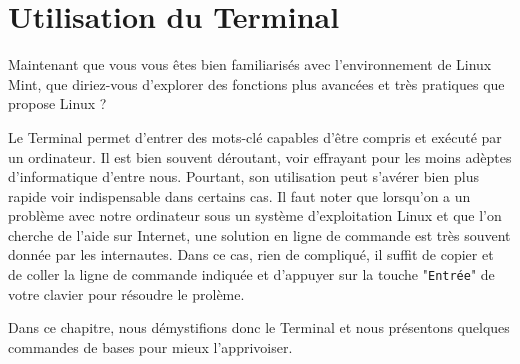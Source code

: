 \documentclass[12pt]{book}
\begin{document}
\chapter{Utilisation du Terminal}\label{sec:terminal}%
Maintenant que vous vous êtes bien familiarisés avec l'environnement de Linux Mint, que diriez-vous d'explorer des fonctions plus avancées et très pratiques que propose Linux ?\par
Le Terminal permet d'entrer des mots-clé capables d'être compris et exécuté par un ordinateur.
Il est bien souvent déroutant, voir effrayant pour les moins adèptes d'informatique d'entre nous.
Pourtant, son utilisation peut s'avérer bien plus rapide voir indispensable dans certains cas.
Il faut noter que lorsqu'on a un problème avec notre ordinateur sous un système d'exploitation Linux et que l'on cherche de l'aide sur Internet, une solution en ligne de commande est très souvent donnée par les internautes.
Dans ce cas, rien de compliqué, il suffit de copier et de coller la ligne de commande indiquée et d'appuyer sur la touche "\texttt{Entrée}" de votre clavier pour résoudre le prolème.\par
Dans ce chapitre, nous démystifions donc le Terminal et nous présentons quelques commandes de bases pour mieux l'apprivoiser.
\end{document}
